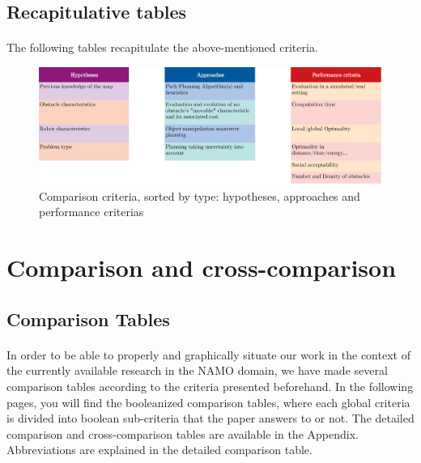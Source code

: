 \subsection{Recapitulative tables}

\paragraph{} The following tables recapitulate the above-mentioned criteria.

\begin{figure}[H]
\centering
\includegraphics[width=14cm]{Comparison_Table/01_comparison_criteria}
\decoRule
\caption[Comparison criteria listing]{Comparison criteria, sorted by type: hypotheses, approaches and performance criterias}
\label{fig:comparison_criteria}
\end{figure}

\clearpage

\section{Comparison and cross-comparison}

\subsection{Comparison Tables}

\paragraph{} In order to be able to properly and graphically situate our work in the context of the currently available research in the NAMO domain, we have made several comparison tables according to the criteria presented beforehand. In the following pages, you will find the booleanized comparison tables, where each global criteria is divided into boolean sub-criteria that the paper answers to or not. The detailed comparison and cross-comparison tables are available in the  Appendix. Abbreviations are explained in the detailed comparison table.

